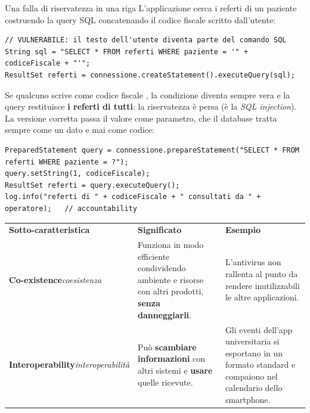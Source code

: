 \begin{esempio}{Una falla di riservatezza in una riga}
L'applicazione cerca i referti di un paziente costruendo la query SQL concatenando il codice fiscale scritto
dall'utente:
\begin{lstlisting}[style=java, name=ArchivioReferti.java]
// VULNERABILE: il testo dell'utente diventa parte del comando SQL
String sql = "SELECT * FROM referti WHERE paziente = '" + codiceFiscale + "'";
ResultSet referti = connessione.createStatement().executeQuery(sql);
\end{lstlisting}
Se qualcuno scrive come codice fiscale , la condizione diventa sempre vera e la query restituisce
\textbf{i referti di tutti}: la riservatezza è persa (è la \textit{SQL injection}). La versione corretta passa il valore
come parametro, che il database tratta sempre come un dato e mai come codice:
\begin{lstlisting}[style=java, name=ArchivioReferti.java]
PreparedStatement query = connessione.prepareStatement("SELECT * FROM referti WHERE paziente = ?");
query.setString(1, codiceFiscale);
ResultSet referti = query.executeQuery();
log.info("referti di " + codiceFiscale + " consultati da " + operatore);   // accountability
\end{lstlisting}
\end{esempio}



\begin{table}[H]
\centering
\renewcommand{\arraystretch}{1.4}
\begin{tabularx}{\textwidth}{P{3.6cm} L L}
\textbf{Sotto-caratteristica} & \textbf{Significato} & \textbf{Esempio} \\
\textbf{Co-existence}\newline\textit{\small coesistenza} & Funziona in modo efficiente condividendo ambiente e risorse con altri prodotti, \textbf{senza danneggiarli}. & L'antivirus non rallenta al punto da rendere inutilizzabili le altre applicazioni. \\
\textbf{Interoperability}\newline\textit{\small interoperabilità} & Può \textbf{scambiare informazioni} con altri sistemi e \textbf{usare} quelle ricevute. & Gli eventi dell'app universitaria si esportano in un formato standard e compaiono nel calendario dello smartphone. \\
\bottomrule
\end{tabularx}
\end{table}

